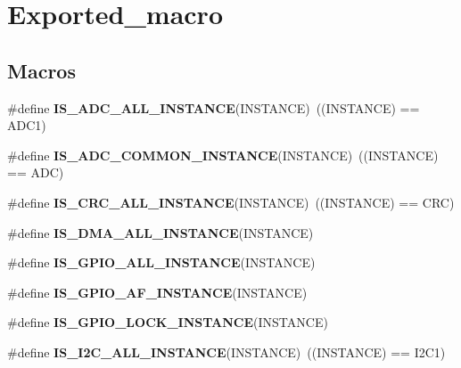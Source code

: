 \hypertarget{group___exported__macro}{}\section{Exported\+\_\+macro}
\label{group___exported__macro}
\subsection*{Macros}
\begin{DoxyCompactItemize}
\item 
\mbox{\label{group___exported__macro_ga2204b62b378bcf08b3b9006c184c7c23}} 
\#define {\bfseries I\+S\+\_\+\+A\+D\+C\+\_\+\+A\+L\+L\+\_\+\+I\+N\+S\+T\+A\+N\+CE}(I\+N\+S\+T\+A\+N\+CE)~((I\+N\+S\+T\+A\+N\+CE) == A\+D\+C1)
\item 
\mbox{\label{group___exported__macro_gad8a5831c786b6b265531b890a194cbe2}} 
\#define {\bfseries I\+S\+\_\+\+A\+D\+C\+\_\+\+C\+O\+M\+M\+O\+N\+\_\+\+I\+N\+S\+T\+A\+N\+CE}(I\+N\+S\+T\+A\+N\+CE)~((I\+N\+S\+T\+A\+N\+CE) == A\+DC)
\item 
\mbox{\label{group___exported__macro_gaa514941a7f02f65eb27450c05e4e8dd1}} 
\#define {\bfseries I\+S\+\_\+\+C\+R\+C\+\_\+\+A\+L\+L\+\_\+\+I\+N\+S\+T\+A\+N\+CE}(I\+N\+S\+T\+A\+N\+CE)~((I\+N\+S\+T\+A\+N\+CE) == C\+RC)
\item 
\#define {\bfseries I\+S\+\_\+\+D\+M\+A\+\_\+\+A\+L\+L\+\_\+\+I\+N\+S\+T\+A\+N\+CE}(I\+N\+S\+T\+A\+N\+CE)
\item 
\#define {\bfseries I\+S\+\_\+\+G\+P\+I\+O\+\_\+\+A\+L\+L\+\_\+\+I\+N\+S\+T\+A\+N\+CE}(I\+N\+S\+T\+A\+N\+CE)
\item 
\#define {\bfseries I\+S\+\_\+\+G\+P\+I\+O\+\_\+\+A\+F\+\_\+\+I\+N\+S\+T\+A\+N\+CE}(I\+N\+S\+T\+A\+N\+CE)
\item 
\#define {\bfseries I\+S\+\_\+\+G\+P\+I\+O\+\_\+\+L\+O\+C\+K\+\_\+\+I\+N\+S\+T\+A\+N\+CE}(I\+N\+S\+T\+A\+N\+CE)
\item 
\mbox{\label{group___exported__macro_gacdf0149a4e8c41a6814c13613c38a6b2}} 
\#define {\bfseries I\+S\+\_\+\+I2\+C\+\_\+\+A\+L\+L\+\_\+\+I\+N\+S\+T\+A\+N\+CE}(I\+N\+S\+T\+A\+N\+CE)~((I\+N\+S\+T\+A\+N\+CE) == I2\+C1)
\item 
\mbox{\label{group___exported__macro_gad9ec4c52f0572ee67d043e006f1d5e39}} 

\end{DoxyCompactItemize}
